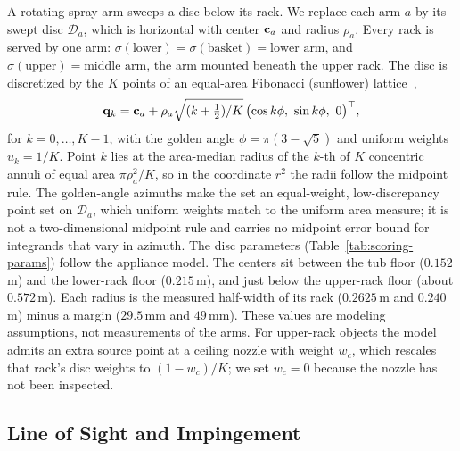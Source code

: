 A rotating spray arm sweeps a disc below its rack.
We replace each arm $a$ by its swept disc $\mathcal{D}_a$, which is horizontal with center $\mathbf{c}_a$ and radius $\rho_a$.
Every rack is served by one arm: $\sigma(\text{lower})=\sigma(\text{basket})=\text{lower arm}$, and $\sigma(\text{upper})=\text{middle arm}$, the arm mounted beneath the upper rack.
The disc is discretized by the $K$ points of an equal-area Fibonacci (sunflower) lattice~\cite{vogel1979sunflower},
\begin{equation}
\mathbf{q}_k=\mathbf{c}_a+\rho_a\sqrt{(k+\tfrac12)/K}\,\bigl(\cos k\phi,\ \sin k\phi,\ 0\bigr)^\top,
\label{eq:sunflower}
\end{equation}
for $k=0,\dots,K-1$, with the golden angle $\phi=\pi(3-\sqrt5)$ and uniform weights $u_k=1/K$.
Point $k$ lies at the area-median radius of the $k$-th of $K$ concentric annuli of equal area $\pi\rho_a^2/K$, so in the coordinate $r^2$ the radii follow the midpoint rule.
The golden-angle azimuths make the set an equal-weight, low-discrepancy point set on $\mathcal{D}_a$, which uniform weights match to the uniform area measure; it is not a two-dimensional midpoint rule and carries no midpoint error bound for integrands that vary in azimuth.
The disc parameters (Table~\ref{tab:scoring-params}) follow the appliance model.
The centers sit between the tub floor ($0.152$\,m) and the lower-rack floor ($0.215$\,m), and just below the upper-rack floor (about $0.572$\,m).
Each radius is the measured half-width of its rack ($0.2625$\,m and $0.240$\,m) minus a margin ($29.5$\,mm and $49$\,mm).
These values are modeling assumptions, not measurements of the arms.
For upper-rack objects the model admits an extra source point at a ceiling nozzle with weight $w_c$, which rescales that rack's disc weights to $(1-w_c)/K$; we set $w_c=0$ because the nozzle has not been inspected.

\subsection{Line of Sight and Impingement}
\label{sec:scoring-visibility}

